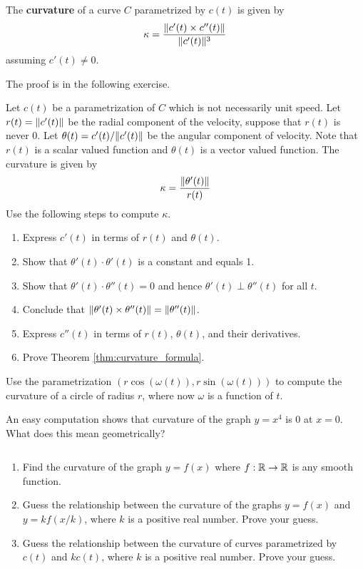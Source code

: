 \begin{thm}
	\label{thm:curvature_formula}
	The \textbf{curvature} of a curve $ C$ parametrized by $ c(t)$ is given by
	\begin{align*}
		\kappa = \dfrac{\lVert c'(t) \times c''(t) \rVert}{\lVert c'(t) \rVert^3}
	\end{align*}
	assuming $c'(t) \neq 0$.
\end{thm}
\noindent The proof is in the following exercise.
\begin{ques}
	Let $ c(t)$ be a parametrization of $ C$ which is not necessarily unit speed. Let $ r(t) = \lVert c'(t) \rVert$ be the radial component of the velocity, suppose that $ r(t)$ is never 0. Let $ \theta(t) = c'(t)/ \lVert c'(t) \rVert$ be the angular component of velocity. Note that $r(t)$ is a scalar valued function and $\theta(t)$ is a vector valued function. The curvature is given by
	\begin{align*}
		\kappa = \dfrac{\lVert \theta'(t) \rVert}{r(t)}
	\end{align*}
	Use the following steps to compute $ \kappa$.
	\begin{enumerate}
    \item Express $c'(t)$ in terms of $r(t)$ and $\theta(t)$.
    \item Show that $ \theta'(t) \cdot \theta'(t)$ is a constant and equals 1.
		\item Show that $ \theta'(t) \cdot \theta''(t) = 0$ and hence $\theta'(t) \perp \theta''(t)$ for all $t$.
		\item Conclude that $ \lVert \theta'(t) \times \theta''(t) \rVert = \lVert \theta''(t) \rVert$.
		\item Express $ c''(t)$ in terms of $ r(t)$, $ \theta(t)$, and their derivatives.
		\item Prove Theorem \ref{thm:curvature_formula}.
	\end{enumerate}
\end{ques}
\begin{ques}
	Use the parametrization $(r \cos (\omega(t)), r \sin(\omega(t)))$ to compute the curvature of a circle of radius $r$, where now $\omega$ is a function of $t$.
\end{ques}
\begin{ques}
	An easy computation shows that curvature of the graph $y=x^4$ is 0 at $x=0$. What does this mean geometrically?
\end{ques}
\begin{ques} $ $
	\begin{enumerate}
		\item Find the curvature of the graph $y=f(x)$ where $f:\mathbb{R} \rightarrow \mathbb{R}$ is any smooth function.
		\item Guess the relationship between the curvature of the graphs $y=f(x)$ and $y=kf(x/k)$, where $k$ is a positive real number. Prove your guess.
		\item Guess the relationship between the curvature of curves parametrized by $c(t)$ and $kc(t)$, where $k$ is a positive real number. Prove your guess.
	\end{enumerate}
\end{ques}
